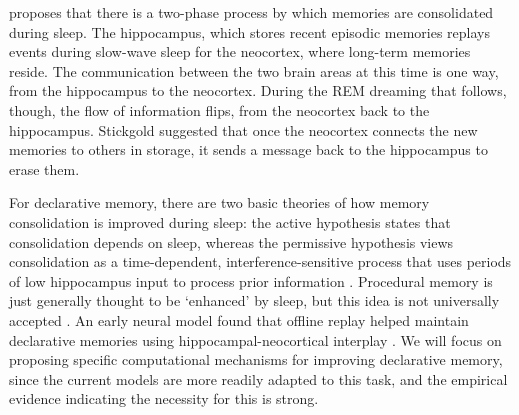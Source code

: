 \documentclass[10pt,letterpaper]{article}
\begin{document}
 proposes that there is a two-phase process by which memories are consolidated during sleep. The hippocampus, which stores recent episodic memories replays events during slow-wave sleep for the neocortex, where long-term memories reside. The communication between the two brain areas at this time is one way, from the hippocampus to the neocortex. During the REM dreaming that follows, though, the flow of information flips, from the neocortex back to the hippocampus. Stickgold suggested that once the neocortex connects the new memories to others in storage, it sends a message back to the hippocampus to erase them.

For declarative memory, there are two basic theories of how memory consolidation is improved during sleep: the active hypothesis states that consolidation depends on sleep, whereas the permissive hypothesis views consolidation as a time-dependent, interference-sensitive process that uses periods of low hippocampus input to process prior information \cite{Mednick:2010}. Procedural memory is just generally thought to be `enhanced' by sleep, but this idea is not universally accepted \cite{Mednick:2010}. An early neural model found that offline replay helped maintain declarative memories using hippocampal-neocortical interplay \cite{Kali:2004}. We will focus on proposing specific computational mechanisms for improving declarative memory, since the current models are more readily adapted to this task, and the empirical evidence indicating the necessity for this is strong.

\vspace{-.2cm}
\end{document}
